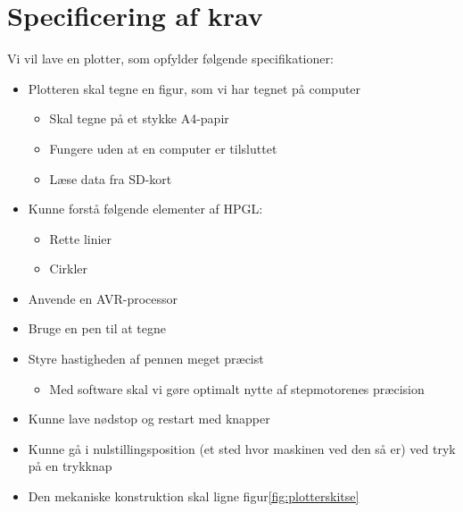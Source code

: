 \section{Specificering af krav}
\label{sc:specificering af krav}

Vi vil lave en plotter, som opfylder følgende specifikationer:

\begin{itemize}
\item Plotteren skal tegne en figur, som vi har tegnet på computer
  \begin{itemize}
  \item Skal tegne på et stykke A4-papir
  \item Fungere uden at en computer er tilsluttet
  \item Læse data fra SD-kort
  \end{itemize}
\item Kunne forstå følgende elementer af HPGL:
  \begin{itemize}
  \item Rette linier
  \item Cirkler
  \end{itemize}
\item Anvende en AVR-processor
\item Bruge en pen til at tegne
\item Styre hastigheden af pennen meget præcist
  \begin{itemize}
  \item Med software skal vi gøre optimalt nytte af stepmotorenes præcision
  \end{itemize}
\item Kunne lave nødstop og restart med knapper
\item Kunne gå i nulstillingsposition (et sted hvor maskinen ved den
  så er) ved tryk på en trykknap
\item Den mekaniske konstruktion skal ligne figur\vref{fig:plotterskitse}
\end{itemize}
